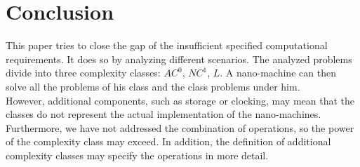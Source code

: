 \documentclass[10pt,sigconf]{acmart}
\begin{document}
\section{Conclusion}
This paper tries to close the gap of the insufficient specified computational requirements.
It does so by analyzing different scenarios. 
The analyzed problems divide into three complexity classes: $AC^0$, $NC^1$, $L$.
A nano-machine can then solve all the problems of his class and the class problems under him.\\
However, additional components, such as storage or clocking, may mean that the classes do not represent the actual implementation of the nano-machines.
Furthermore, we have not addressed the combination of operations, so the power of the complexity class may exceed.
In addition, the definition of additional complexity classes may specify the operations in more detail.








 
\end{document}
